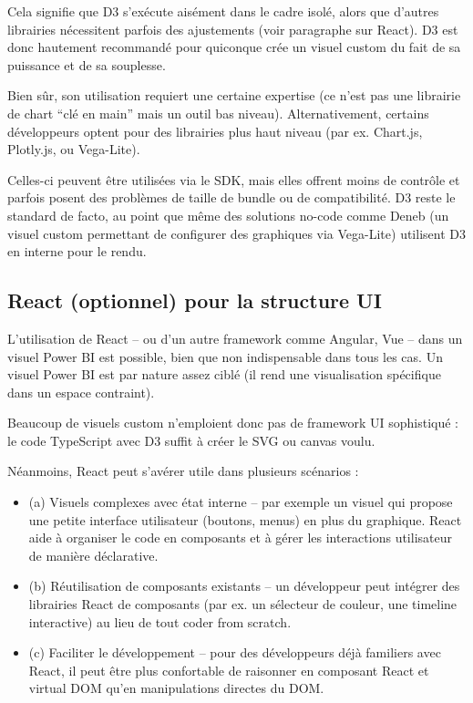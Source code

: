 Cela signifie que D3 s’exécute aisément dans le cadre isolé, alors que d’autres librairies nécessitent parfois des ajustements (voir paragraphe sur React). D3 est donc hautement recommandé pour quiconque crée un visuel custom du fait de sa puissance et de sa souplesse.

Bien sûr, son utilisation requiert une certaine expertise (ce n’est pas une librairie de chart “clé en main” mais un outil bas niveau). Alternativement, certains développeurs optent pour des librairies plus haut niveau (par ex. Chart.js, Plotly.js, ou Vega-Lite).

Celles-ci peuvent être utilisées via le SDK, mais elles offrent moins de contrôle et parfois posent des problèmes de taille de bundle ou de compatibilité. D3 reste le standard de facto, au point que même des solutions no-code comme Deneb (un visuel custom permettant de configurer des graphiques via Vega-Lite) utilisent D3 en interne pour le rendu.

\subsection{React (optionnel) pour la structure UI}

L’utilisation de React – ou d’un autre framework comme Angular, Vue – dans un visuel Power BI est possible, bien que non indispensable dans tous les cas. Un visuel Power BI est par nature assez ciblé (il rend une visualisation spécifique dans un espace contraint).

Beaucoup de visuels custom n’emploient donc pas de framework UI sophistiqué : le code TypeScript avec D3 suffit à créer le SVG ou canvas voulu.

Néanmoins, React peut s’avérer utile dans plusieurs scénarios :
\begin{itemize}
  \item (a) Visuels complexes avec état interne – par exemple un visuel qui propose une petite interface utilisateur (boutons, menus) en plus du graphique. React aide à organiser le code en composants et à gérer les interactions utilisateur de manière déclarative.
  \item (b) Réutilisation de composants existants – un développeur peut intégrer des librairies React de composants (par ex. un sélecteur de couleur, une timeline interactive) au lieu de tout coder from scratch.
  \item (c) Faciliter le développement – pour des développeurs déjà familiers avec React, il peut être plus confortable de raisonner en composant React et virtual DOM qu’en manipulations directes du DOM.
\end{itemize}

